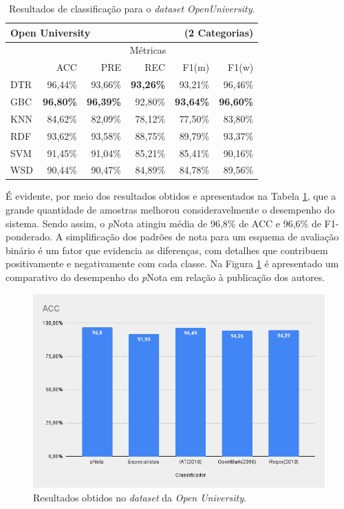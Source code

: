 \begin{table}
\centering
\caption{Resultados de classificação para o \textit{dataset OpenUniversity}.}
\label{tab-OU}
\begin{tabular}{l r r r r r}
    \hline
    \multicolumn{4}{l}{\textbf{Open University}} &  \multicolumn{2}{r}{(2 Categorias)} \\ \hline
     & \multicolumn{5}{c}{M{\'e}tricas} \\ \cline{2-6}

     & ACC & PRE & REC & F1(m) & F1(w) \\ \cline{2-6}
    DTR & 96,44\% & 93,66\% & \textbf{93,26\%} & 93,21\% & 96,46\% \\
    GBC & \textbf{96,80\%} & \textbf{96,39\%} & 92,80\% & \textbf{93,64\%} & \textbf{96,60\%} \\
    KNN & 84,62\% & 82,09\% & 78,12\% & 77,50\% & 83,80\% \\
    RDF & 93,62\% & 93,58\% & 88,75\% & 89,79\% & 93,37\% \\
    SVM & 91,45\% & 91,04\% & 85,21\% & 85,41\% & 90,16\% \\
    WSD & 90,44\% & 90,47\% & 84,89\% & 84,78\% & 89,56\% \\

    \hline
    \hline
\end{tabular}
\end{table}

É evidente, por meio dos resultados obtidos e apresentados na Tabela \ref{tab-OU}, que a grande quantidade de amostras melhorou consideravelmente o desempenho do sistema. Sendo assim, o \textit{p}Nota atingiu média de 96,8\% de ACC e 96,6\% de F1-ponderado. A simplificação dos padrões de nota para um esquema de avaliação binário é um fator que evidencia as diferenças, com detalhes que contribuem positivamente e negativamente com cada classe. Na Figura \ref{fig-OU} é apresentado um comparativo do desempenho do \textit{p}Nota em relação à publicação dos autores.

\begin{figure}[!h]
\centering
\includegraphics[width=.6\textwidth]{figuras/OU/res-ou-acc.png}
\caption{Resultados obtidos no \textit{dataset} da \textit{Open University}.}
\label{fig-OU}
\end{figure}

